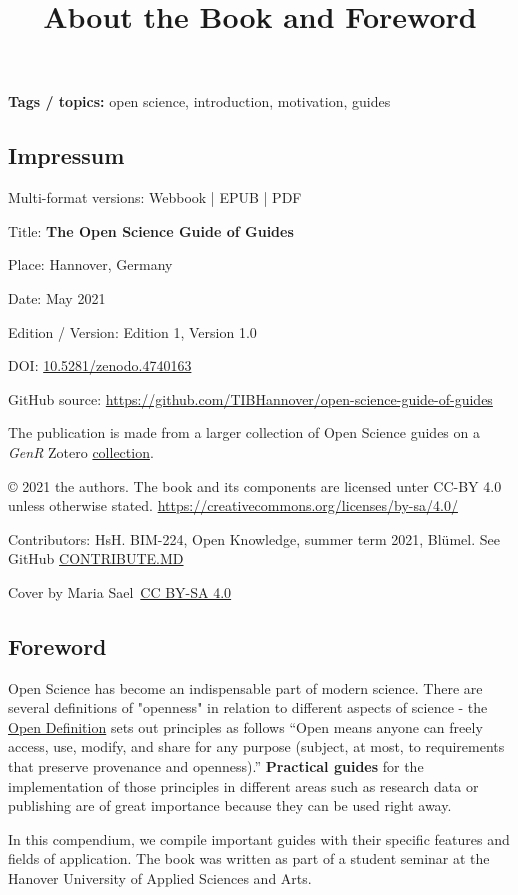 \documentclass{article}
\begin{document}
\title{About the Book and Foreword}

\maketitle


\textbf{Tags / topics:} open science, introduction, motivation, guides


\subsection{Impressum}\label{H8810070}



Multi-format versions: Webbook | EPUB | PDF  


Title: \textbf{The Open Science Guide of Guides}


Place: Hannover, Germany


Date: May 2021


Edition / Version: Edition 1, Version 1.0


DOI: \href{https://doi.org/10.5281/zenodo.4740163}{10.5281/zenodo.4740163}


GitHub source: \href{https://github.com/TIBHannover/open-science-guide-of-guides}{https://github.com/TIBHannover/open-science-guide-of-guides} 


The publication is made from a larger collection of Open Science guides on a \emph{GenR} Zotero \href{https://www.zotero.org/groups/1838445/generation_r/collections/DND4FSHT}{collection}.


© 2021 the authors. The book and its components are licensed unter CC-BY 4.0 unless otherwise stated. \href{https://creativecommons.org/licenses/by-sa/4.0/}{https://creativecommons.org/licenses/by-sa/4.0/} 


Contributors: HsH. BIM-224, Open Knowledge, summer term 2021, Blümel. See GitHub \href{https://github.com/TIBHannover/open-science-guide-of-guides/blob/main/CONTRIBUTE.MD}{CONTRIBUTE.MD} 


Cover by Maria Sael \href{https://creativecommons.org/licenses/by-sa/4.0/}{CC BY-SA 4.0}


\subsection{Foreword}\label{H592737}



Open Science has become an indispensable part of modern science. There are several definitions of "openness" in relation to different aspects of science - the \href{https://opendefinition.org/}{Open Definition} sets out principles as follows “Open means anyone can freely access, use, modify, and share for any purpose (subject, at most, to requirements that preserve provenance and openness).” \textbf{Practical guides} for the implementation of those principles in different areas such as research data or publishing are of great importance because they can be used right away. 


In this compendium, we compile important guides with their specific features and fields of application. The book was written as part of a student seminar at the Hanover University of Applied Sciences and Arts.
\end{document}

